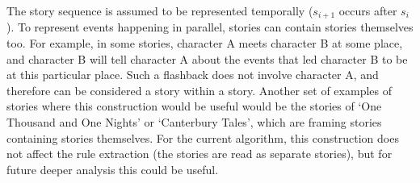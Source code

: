 The story sequence is assumed to be represented temporally ($s_{i+1}$ occurs
after $s_i$). To represent events happening in parallel, stories can contain
stories themselves too. For example, in some stories, character A meets
character B at some place, and character B will tell character A about the
events that led character B to be at this particular place. Such a flashback
does not involve character A, and therefore can be considered a story within a
story. Another set of examples of stories where this construction would be
useful would be the stories of `One Thousand and One Nights' or `Canterbury Tales',
which are framing stories containing stories themselves. For the current algorithm, this construction does not
affect the rule extraction (the stories are read as separate stories), 
but for future deeper analysis this could be useful.


